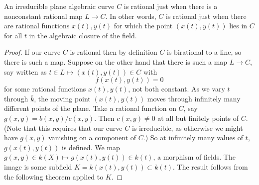 \begin{theorem}
An irreducible plane algebraic curve \(C\) is rational just when there is a nonconstant rational map \(L \to C\).
In other words, \(C\) is rational just when there are rational functions \(x(t),y(t)\) for which the point \((x(t),y(t))\) lies in \(C\) for all \(t\) in the algebraic closure of the field.
\end{theorem}
\begin{proof}
If our curve \(C\) is rational then by definition \(C\) is birational to a line, so there is such a map.
Suppose on the other hand that there is such a map \(L \to C\), say written as \(t \in L \mapsto (x(t),y(t)) \in C\) with
\[
f(x(t),y(t))=0
\]
for some rational functions \(x(t), y(t)\), not both constant.
As we vary \(t\) through \(\bar{k}\), the moving point \((x(t),y(t))\) moves through infinitely many different points of the plane.
Take a rational function on \(C\), say \(g(x,y)=b(x,y)/c(x,y)\).
Then \(c(x,y)\ne 0\) at all but finitely points of \(C\).
(Note that this requires that our curve \(C\) is irreducible, as otherwise we might have \(g(x,y)\) vanishing on a component of \(C\).)
So at infinitely many values of \(t\), \(g(x(t),y(t))\) is defined.
We map \(g(x,y) \in k(X) \mapsto g(x(t),y(t)) \in k(t)\), a morphism of fields. 
The image is some subfield \(K=k(x(t),y(t)) \subset k(t)\).
The result follows from the following theorem applied to \(K\).
\end{proof}

